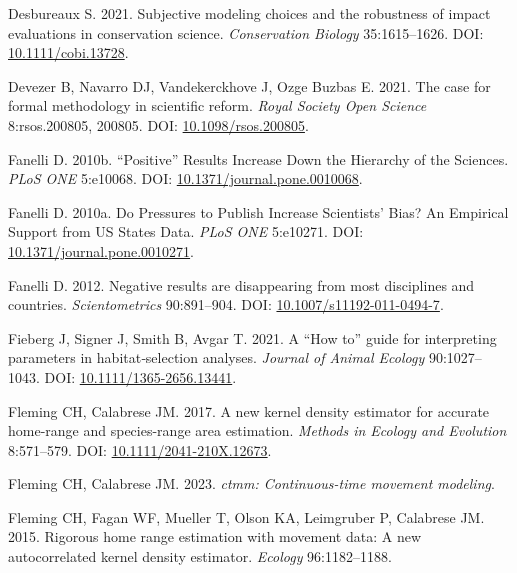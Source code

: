 \documentclass[10pt,a4paper]{article}
\newlength{\cslhangindent}
\newenvironment{CSLReferences}[2] %
 {\begin{list}{}{%
  \setlength{\itemindent}{0pt}
  \setlength{\leftmargin}{0pt}
  \setlength{\parsep}{0pt}
  \ifodd #1
   \setlength{\leftmargin}{\cslhangindent}
   \setlength{\itemindent}{-1\cslhangindent}
  \fi
  \setlength{\itemsep}{#2\baselineskip}}}
 {\end{list}}
\begin{document}
\begin{CSLReferences}{1}{0}
Desbureaux S. 2021. Subjective modeling choices and the robustness of impact evaluations in conservation science. \emph{Conservation Biology} 35:1615--1626. DOI: \href{https://doi.org/10.1111/cobi.13728}{10.1111/cobi.13728}.

Devezer B, Navarro DJ, Vandekerckhove J, Ozge Buzbas E. 2021. The case for formal methodology in scientific reform. \emph{Royal Society Open Science} 8:rsos.200805, 200805. DOI: \href{https://doi.org/10.1098/rsos.200805}{10.1098/rsos.200805}.

Fanelli D. 2010b. {``{Positive}''} {Results} {Increase} {Down} the {Hierarchy} of the {Sciences}. \emph{PLoS ONE} 5:e10068. DOI: \href{https://doi.org/10.1371/journal.pone.0010068}{10.1371/journal.pone.0010068}.

Fanelli D. 2010a. Do {Pressures} to {Publish} {Increase} {Scientists}' {Bias}? {An} {Empirical} {Support} from {US} {States} {Data}. \emph{PLoS ONE} 5:e10271. DOI: \href{https://doi.org/10.1371/journal.pone.0010271}{10.1371/journal.pone.0010271}.

Fanelli D. 2012. Negative results are disappearing from most disciplines and countries. \emph{Scientometrics} 90:891--904. DOI: \href{https://doi.org/10.1007/s11192-011-0494-7}{10.1007/s11192-011-0494-7}.

Fieberg J, Signer J, Smith B, Avgar T. 2021. A {``{How} to''} guide for interpreting parameters in habitat‐selection analyses. \emph{Journal of Animal Ecology} 90:1027--1043. DOI: \href{https://doi.org/10.1111/1365-2656.13441}{10.1111/1365-2656.13441}.

Fleming CH, Calabrese JM. 2017. A new kernel density estimator for accurate home-range and species-range area estimation. \emph{Methods in Ecology and Evolution} 8:571--579. DOI: \href{https://doi.org/10.1111/2041-210X.12673}{10.1111/2041-210X.12673}.

Fleming CH, Calabrese JM. 2023. \emph{{ctmm}: Continuous-time movement modeling}.

Fleming CH, Fagan WF, Mueller T, Olson KA, Leimgruber P, Calabrese JM. 2015. Rigorous home range estimation with movement data: {A} new autocorrelated kernel density estimator. \emph{Ecology} 96:1182--1188.


\end{CSLReferences}
\end{document}
